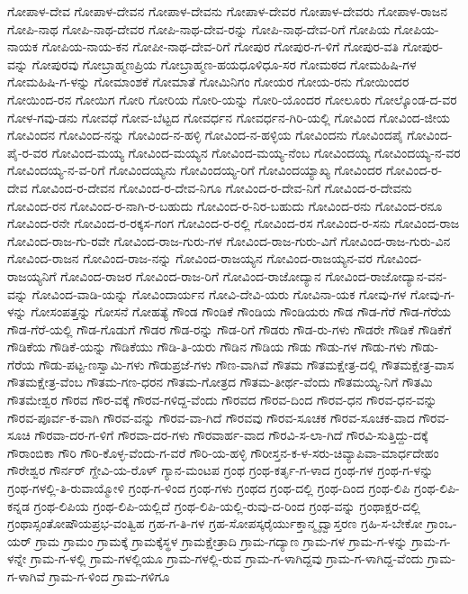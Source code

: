 ಗೋಪಾಳ-ದೇವ
ಗೋಪಾಳ-ದೇವನ
ಗೋಪಾಳ-ದೇವನು
ಗೋಪಾಳ-ದೇವರ
ಗೋಪಾಳ-ದೇವರು
ಗೋಪಾಳ-ರಾಜನ
ಗೋಪಿ-ನಾಥ
ಗೋಪಿ-ನಾಥ-ದೇವರ
ಗೋಪಿ-ನಾಥ-ದೇವ-ರನ್ನು
ಗೋಪಿ-ನಾಥ-ದೇವ-ರಿಗೆ
ಗೋಪಿಯ
ಗೋಪಿಯ-ನಾಯಕ
ಗೋಪಿಯ-ನಾಯ-ಕನ
ಗೋಪೀ-ನಾಥ-ದೇವ-ರಿಗೆ
ಗೋಪುರ
ಗೋಪುರ-ಗ-ಳಿಗೆ
ಗೋಪುರ-ವತಿ
ಗೋಪುರ-ವನ್ನು
ಗೋಪುರವು
ಗೋಬ್ರಾಹ್ಮಣಪ್ರಿಯ
ಗೋಬ್ರಾಹ್ಮಣ-ಹಯಧೂಳಿಧೂ-ಸರ
ಗೋಮಠದ
ಗೋಮಹಿಷಿ-ಗಳ
ಗೋಮಹಿಷಿ-ಗ-ಳನ್ನು
ಗೋಮಾಂಶಕೆ
ಗೋಮಾತೆ
ಗೋಮಿನಿಗಂ
ಗೋಯರ
ಗೋಯ-ರನು
ಗೋಯಿಂದರ
ಗೋಯಿಂದ-ರನ
ಗೋಯಿಗ
ಗೋರಿ
ಗೋರಿಯ
ಗೋರಿ-ಯನ್ನು
ಗೋರಿ-ಯೊಂದರ
ಗೋಲೂರು
ಗೋಲ್ಕೊಂಡ-ದ-ವರ
ಗೋಳ-ಗವು-ಡನು
ಗೋವಧೆ
ಗೋವ-ಬೆಟ್ಟದ
ಗೋವರ್ಧನ
ಗೋವರ್ಧನ-ಗಿರಿ-ಯಲ್ಲಿ
ಗೋವಿಂದ
ಗೋವಿಂದ-ಜೀಯ
ಗೋವಿಂದನ
ಗೋವಿಂದ-ನನ್ನು
ಗೋವಿಂದ-ನ-ಹಳ್ಳಿ
ಗೋವಿಂದ-ನ-ಹಳ್ಳಿಯ
ಗೋವಿಂದನು
ಗೋವಿಂದಪೈ
ಗೋವಿಂದ-ಪೈ-ರ-ವರ
ಗೋವಿಂದ-ಮಯ್ಯ
ಗೋವಿಂದ-ಮಯ್ಯನ
ಗೋವಿಂದ-ಮಯ್ಯ-ನೆಂಬ
ಗೋವಿಂದಯ್ಯ
ಗೋವಿಂದಯ್ಯ-ನ-ವರ
ಗೋವಿಂದಯ್ಯ-ನ-ವ-ರಿಗೆ
ಗೋವಿಂದಯ್ಯನು
ಗೋವಿಂದಯ್ಯ-ರಿಗೆ
ಗೋವಿಂದಯ್ಯಾಖ್ಯ
ಗೋವಿಂದರ
ಗೋವಿಂದ-ರ-ದೇವ
ಗೋವಿಂದ-ರ-ದೇವನ
ಗೋವಿಂದ-ರ-ದೇವ-ನಿಗೂ
ಗೋವಿಂದ-ರ-ದೇವ-ನಿಗೆ
ಗೋವಿಂದ-ರ-ದೇವನು
ಗೋವಿಂದ-ರನ
ಗೋವಿಂದ-ರ-ನಾಗಿ-ರ-ಬಹುದು
ಗೋವಿಂದ-ರ-ನಿರ-ಬಹುದು
ಗೋವಿಂದ-ರನು
ಗೋವಿಂದ-ರನೂ
ಗೋವಿಂದ-ರನೇ
ಗೋವಿಂದ-ರ-ರಕ್ಕಸ-ಗಂಗ
ಗೋವಿಂದ-ರ-ರಲ್ಲಿ
ಗೋವಿಂದ-ರಸ
ಗೋವಿಂದ-ರ-ಸನು
ಗೋವಿಂದ-ರಾಜ
ಗೋವಿಂದ-ರಾಜ-ಗು-ರವೇ
ಗೋವಿಂದ-ರಾಜ-ಗುರು-ಗಳ
ಗೋವಿಂದ-ರಾಜ-ಗುರು-ವಿಗೆ
ಗೋವಿಂದ-ರಾಜ-ಗುರು-ವಿನ
ಗೋವಿಂದ-ರಾಜನ
ಗೋವಿಂದ-ರಾಜ-ನನ್ನು
ಗೋವಿಂದ-ರಾಜಯ್ಯನ
ಗೋವಿಂದ-ರಾಜಯ್ಯನ-ವರ
ಗೋವಿಂದ-ರಾಜಯ್ಯನಿಗೆ
ಗೋವಿಂದ-ರಾಜರ
ಗೋವಿಂದ-ರಾಜ-ರಿಗೆ
ಗೋವಿಂದ-ರಾಜೋದ್ಯಾನ
ಗೋವಿಂದ-ರಾಜೋದ್ಯಾನ-ವನ-ವನ್ನು
ಗೋವಿಂದ-ವಾಡಿ-ಯನ್ನು
ಗೋವಿಂದಾರ್ಯನ
ಗೋವಿ-ದೇವಿ-ಯರು
ಗೋವಿನಾ-ಯಕ
ಗೋವು-ಗಳ
ಗೋವು-ಗ-ಳನ್ನು
ಗೋಸಂಪತ್ತನ್ನು
ಗೋಸನೆ
ಗೋಹತ್ಯೆ
ಗೌಂಡ
ಗೌಂಡಿಕೆ
ಗೌಂಡಿಯ
ಗೌಂಡಿಯರು
ಗೌಡ
ಗೌಡ-ಗೆರೆ
ಗೌಡ-ಗೆರೆಯ
ಗೌಡ-ಗೆರೆ-ಯಲ್ಲಿ
ಗೌಡ-ಗೊಡುಗೆ
ಗೌಡರ
ಗೌಡ-ರನ್ನು
ಗೌಡ-ರಿಗೆ
ಗೌಡರು
ಗೌಡ-ರು-ಗಳು
ಗೌಡರೇ
ಗೌಡಿಕೆ
ಗೌಡಿಕೆಗೆ
ಗೌಡಿಕೆಯ
ಗೌಡಿಕೆ-ಯನ್ನು
ಗೌಡಿಕೆಯು
ಗೌಡಿ-ತಿ-ಯರು
ಗೌಡಿನ
ಗೌಡಿಯ
ಗೌಡು
ಗೌಡು-ಗಳ
ಗೌಡು-ಗಳು
ಗೌಡು-ಗೆರೆಯ
ಗೌಡು-ಪಟ್ಟ-ಣಸ್ವಾಮಿ-ಗಳು
ಗೌಡುಪ್ರಜೆ-ಗಳು
ಗೌಣ-ವಾಗಿವೆ
ಗೌತಮ
ಗೌತಮಕ್ಷೇತ್ರ-ದಲ್ಲಿ
ಗೌತಮಕ್ಷೇತ್ರ-ವಾಸ
ಗೌತಮಕ್ಷೇತ್ರ-ವೆಂಬ
ಗೌತಮ-ಗಣ-ಧರನ
ಗೌತಮ-ಗೋತ್ರದ
ಗೌತಮ-ತೀರ್ಥ-ವೆಂದು
ಗೌತಮಯ್ಯ-ನಿಗೆ
ಗೌತಮಿ
ಗೌತಮೇಶ್ವರ
ಗೌರವ
ಗೌರ-ವಕ್ಕೆ
ಗೌರವ-ಗಳಿದ್ದ-ವೆಂದು
ಗೌರವದ
ಗೌರವ-ದಿಂದ
ಗೌರವ-ಧನ
ಗೌರವ-ಧನ-ವನ್ನು
ಗೌರವ-ಪೂರ್ವ-ಕ-ವಾಗಿ
ಗೌರವ-ವನ್ನು
ಗೌರವ-ವಾ-ಗಿದೆ
ಗೌರವವು
ಗೌರವ-ಸೂಚಕ
ಗೌರವ-ಸೂಚಕ-ವಾದ
ಗೌರವ-ಸೂಚಿ
ಗೌರವಾ-ದರ-ಗ-ಳಿಗೆ
ಗೌರವಾ-ದರ-ಗಳು
ಗೌರವಾರ್ಹ-ವಾದ
ಗೌರವಿ-ಸ-ಲಾ-ಗಿದೆ
ಗೌರವಿ-ಸುತ್ತಿದ್ದು-ದಕ್ಕೆ
ಗೌರಾಂಬಿಕಾ
ಗೌರಿ
ಗೌರಿ-ಕೊಳ್ಳ-ವೆಂದು-ಗ-ವರೆ
ಗೌರಿ-ಯ-ಹಳ್ಳಿ
ಗೌರೀಸ್ತನ-ಕ-ಳ-ಸರು-ಚಿವ್ಯಾಪಿವಾ-ಮಾರ್ಧದೇಹಂ
ಗೌರೇಶ್ವರ
ಗೌರ್ನರ್
ಗ್ದೇವಿ-ಯ-ರೊಳ್
ಗ್ಯಾನ-ಮಂಟಪ
ಗ್ರಂಥ
ಗ್ರಂಥ-ಕರ್ತೃ-ಗ-ಳಾದ
ಗ್ರಂಥ-ಗಳ
ಗ್ರಂಥ-ಗ-ಳನ್ನು
ಗ್ರಂಥ-ಗಳಲ್ಲಿ-ತಿ-ರುವಾಯ್ಮೋಳಿ
ಗ್ರಂಥ-ಗ-ಳಿಂದ
ಗ್ರಂಥ-ಗಳು
ಗ್ರಂಥದ
ಗ್ರಂಥ-ದಲ್ಲಿ
ಗ್ರಂಥ-ದಿಂದ
ಗ್ರಂಥ-ಲಿಪಿ
ಗ್ರಂಥ-ಲಿಪಿ-ಕನ್ನಡ
ಗ್ರಂಥ-ಲಿಪಿಯ
ಗ್ರಂಥ-ಲಿಪಿ-ಯಲ್ಲಿದೆ
ಗ್ರಂಥ-ಲಿಪಿ-ಯಲ್ಲಿ-ರುವು-ದ-ರಿಂದ
ಗ್ರಂಥ-ವನ್ನು
ಗ್ರಂಥಾಕ್ಷರ-ದಲ್ಲಿ
ಗ್ರಂಥಾಸ್ಸಂತೋಷೌಯಪ್ರಭ-ವಂತ್ವಿಹ
ಗ್ರಹ-ಗ-ತಿ-ಗಳ
ಗ್ರಹ-ಸೋಪಸ್ಕರೈರ್ಯುಕ್ತಾನ್ಮೃದ್ವಾಸ್ತರಣ
ಗ್ರಹಿ-ಸ-ಬೇಕೋ
ಗ್ರಾಂಒ-ಯರ್
ಗ್ರಾಮ
ಗ್ರಾಮಂ
ಗ್ರಾಮಕ್ಕೆ
ಗ್ರಾಮಕ್ಕೆಸ್ಥಳ
ಗ್ರಾಮಕ್ಷೇತ್ರಾದಿ
ಗ್ರಾಮ-ಗದ್ಯಾಣ
ಗ್ರಾಮ-ಗಳ
ಗ್ರಾಮ-ಗ-ಳನ್ನು
ಗ್ರಾಮ-ಗ-ಳನ್ನೇ
ಗ್ರಾಮ-ಗ-ಳಲ್ಲಿ
ಗ್ರಾಮ-ಗಳಲ್ಲಿಯೂ
ಗ್ರಾಮ-ಗಳಲ್ಲಿ-ರುವ
ಗ್ರಾಮ-ಗ-ಳಾಗಿದ್ದವು
ಗ್ರಾಮ-ಗ-ಳಾಗಿದ್ದ-ವೆಂದು
ಗ್ರಾಮ-ಗ-ಳಾಗಿವೆ
ಗ್ರಾಮ-ಗ-ಳಿಂದ
ಗ್ರಾಮ-ಗಳಿಗೂ
